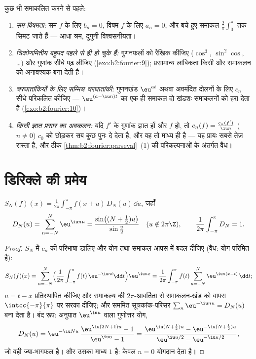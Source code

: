 \begin{method}\label{met:b2:fourier:coefficients}
कुछ भी समाकलित करने से पहले:
\begin{enumerate}
  \item \emph{सम-विषमता:} सम $f$ के लिए $b_n = 0$, विषम $f$ के लिए $a_n
        = 0$, और बचे
        हुए समाकल $\frac2\pi
        \int_0^\pi$ तक सिमट जाते हैं --- आधा श्रम, दुगुनी विश्वसनीयता।
  \item \emph{त्रिकोणमितीय बहुपद पहले से ही हो चुके हैं:} गुणनफलों को
        रैखिक कीजिए ($\cos^3$, $\sin^2\cos$, \dots) और गुणांक सीधे पढ़ लीजिए (\cref{exo:b2:fourier:9});
        प्रसामान्य लांबिकता किसी और समाकलन को अनावश्यक बना देती है।
  \item \emph{चरघातांकियों के लिए सम्मिश्र चरघातांकी:} गुणनखंड $\eu^{at}$ अथवा
        अवमंदित दोलनों के लिए $c_n$ सीधे परिकलित कीजिए --- $\eu^{(a - \iu
        n)t}$ का एक ही
        समाकल दो खंडशः समाकलनों को हरा देता है (\cref{exo:b2:fourier:10})।
  \item \emph{किसी ज्ञात प्रसार का अवकलन:} यदि $f'$ के गुणांक ज्ञात हों
        और $f$  हो, तो $c_n(f) =
        \frac{c_n(f')}{\iu n}$ ($n \neq 0$) $c_0$ को छोड़कर सब कुछ पुनः दे
        देता है, और वह तो माध्य ही है --- यह प्रायः सबसे तेज़ रास्ता
        है, और ठीक \cref{thm:b2:fourier:parseval}~(1) की परिकल्पनाओं के अंतर्गत वैध।
\end{enumerate}
\end{method}

\section{डिरिक्ले की प्रमेय}

\begin{lemma}[डिरिक्ले कर्नेल]\label{lem:b2:fourier:kernel}
$S_N(f)(x) = \frac{1}{2\pi}\int_{-\pi}^{\pi} f(x + u)\,D_N(u)\,\dd
u$, जहाँ
\[
D_N(u) = \sum_{n=-N}^{N} \eu^{\iu nu}
= \frac{\sin\bigl((N + \frac12)u\bigr)}{\sin\frac u2}
\quad (u \notin 2\pi\Z),
\qquad
\frac{1}{2\pi}\int_{-\pi}^{\pi} D_N = 1 .
\]
\end{lemma}

\begin{proof}
$S_N$ में $c_n$ की परिभाषा डालिए और योग तथा समाकल आपस में बदल दीजिए (वैध: योग
परिमित है):
\[
S_N(f)(x)
= \sum_{n=-N}^{N}\Bigl(\frac{1}{2\pi}\int_{-\pi}^{\pi}
f(t)\,\eu^{-\iu nt}\dd t\Bigr)\eu^{\iu nx}
= \frac{1}{2\pi}\int_{-\pi}^{\pi} f(t)
\sum_{n=-N}^{N}\eu^{\iu n(x-t)}\,\dd t ;
\]
$u = t - x$ प्रतिस्थापित कीजिए और समाकल्य की $2\pi$-आवर्तिता से समाकलन-खंड को वापस
$\intcc{-\pi}{\pi}$ पर सरका दीजिए; और सममित सूचकांक-परिसर $\sum_n\eu^{-\iu nu} = D_N(u)$ बना देता है। बंद रूप:
अनुपात $\eu^{\iu u}$ वाला गुणोत्तर योग,
\[
D_N(u) = \eu^{-\iu Nu}\,\frac{\eu^{\iu(2N+1)u} - 1}{\eu^{\iu u} -
1}
= \frac{\eu^{\iu(N + \frac12)u} - \eu^{-\iu(N+\frac12)u}}
{\eu^{\iu u/2} - \eu^{-\iu u/2}} ,
\]
जो वही ज्या-भागफल है। और उसका माध्य $1$ है: केवल $n = 0$ योगदान देता है।
\end{proof}


